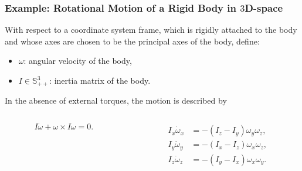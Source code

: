 \begin{frame}
    \frametitle{Example: Rotational Motion of a Rigid Body in $3$D-space}

    With respect to a coordinate system frame, which is rigidly attached to the
    body and whose axes are chosen to be the principal axes of the body, define:
    \begin{itemize}
        \item $\omega$: angular velocity of the body,
        \item $I \in \mathbb{S}_{++}^3$: inertia matrix of the body.
    \end{itemize}
    In the absence of external torques, the motion is described by
    \begin{columns}
        \begin{column}{0.5\textwidth}
            \[ I \dot{\omega} + \omega \times I \omega = 0. \]
        \end{column}
        \begin{column}{0.5\textwidth}
            \begin{align*}
                I_x \dot{\omega}_x &= - (I_z - I_y) \omega_y \omega_z, \\
                I_y \dot{\omega}_y &= - (I_x - I_z) \omega_x \omega_z, \\
                I_z \dot{\omega}_z &= - (I_y - I_x) \omega_x \omega_y.
            \end{align*}
        \end{column}
    \end{columns}
\end{frame}


